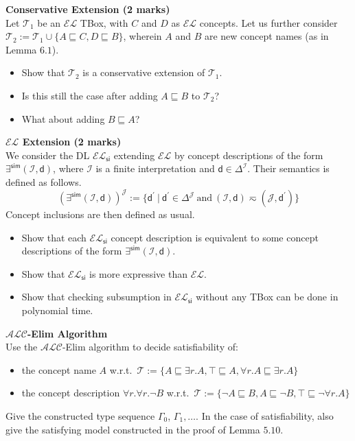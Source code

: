 \documentclass[12pt,a4paper]{article}
\newenvironment{problem}[2][{\color{red}Question}]{\begin{trivlist}
\item[\hskip \labelsep {\bfseries #1}\hskip \labelsep {\bfseries #2.}]}{\end{trivlist}}
\begin{document}
\begin{problem}{{\color{red}6}}
\textbf{Conservative Extension (2 marks)}\\
Let $\mathcal{T}_{1}$ be an $\mathcal{EL}$ TBox, with $C$ and $D$ as $\mathcal{EL}$ concepts. Let us further consider $\mathcal{T}_{2}:=\mathcal{T}_{1}\cup\{A\sqsubseteq C, D\sqsubseteq B\}$, wherein $A$ and $B$ are new concept names (as in Lemma $6.1$). 
\begin{itemize}
\item[-] Show that $\mathcal{T}_{2}$ is a conservative extension of $\mathcal{T}_{1}$.
\item[-] Is this still the case after adding $A\sqsubseteq B$ to $\mathcal{T}_{2}$?
\item[-] What about adding $B\sqsubseteq A$?
\end{itemize}
\end{problem}

\begin{problem}{{\color{red}7}}
\textbf{$\mathcal{EL}$ Extension (2 marks)}\\
We consider the DL $\mathcal{EL}_{\textsf{si}}$ extending $\mathcal{EL}$ by concept descriptions of the form $\exists^{\textsf{sim}}(\mathcal{I},\textsf{d})$, where $\mathcal{I}$ is a finite interpretation and $\textsf{d}\in\Delta^{\mathcal{I}}$. Their semantics is defined as follows.
\[(\exists^{\textsf{sim}}(\mathcal{I},\textsf{d}))^{\mathcal{J}}:=\{\textsf{d}^{\prime}~|~\textsf{d}^{\prime}\in\Delta^{\mathcal{J}}~\text{and}~(\mathcal{I},\textsf{d})\eqsim(\mathcal{J},\textsf{d}^{\prime})\}\]
Concept inclusions are then defined as usual.
\begin{itemize}
\item[-] Show that each $\mathcal{EL}_\textsf{si}$ concept description is equivalent to some concept descriptions of the form $\exists^{\textsf{sim}}(\mathcal{I},\textsf{d})$.
\item[-] Show that $\mathcal{EL}_\textsf{si}$ is more expressive than $\mathcal{EL}$.
\item[-] Show that checking subsumption in $\mathcal{EL}_\textsf{si}$ without any TBox can be done in polynomial time.
\end{itemize}
\end{problem}

\begin{problem}{{\color{red}8}}
\textbf{$\mathcal{ALC}$-Elim Algorithm}\\
Use the $\mathcal{ALC}$-Elim algorithm to decide satisfiability of:
\begin{itemize}
\item[-] the concept name $A$ w.r.t.\ $\mathcal{T}:=\{A\sqsubseteq\exists r.A, \top\sqsubseteq A, \forall r.A\sqsubseteq\exists r.A\}$
\item[-] the concept description $\forall r.\forall r.\neg B$ w.r.t.\ $\mathcal{T}:=\{\neg A\sqsubseteq B, A\sqsubseteq\neg B, \top\sqsubseteq\neg\forall r.A\}$
\end{itemize}
Give the constructed type sequence $\Gamma_{0}$, $\Gamma_{1},\ldots$. In the case of satisfiability, also give the satisfying model constructed in the proof of Lemma $5.10$.
\end{problem}
\end{document}

